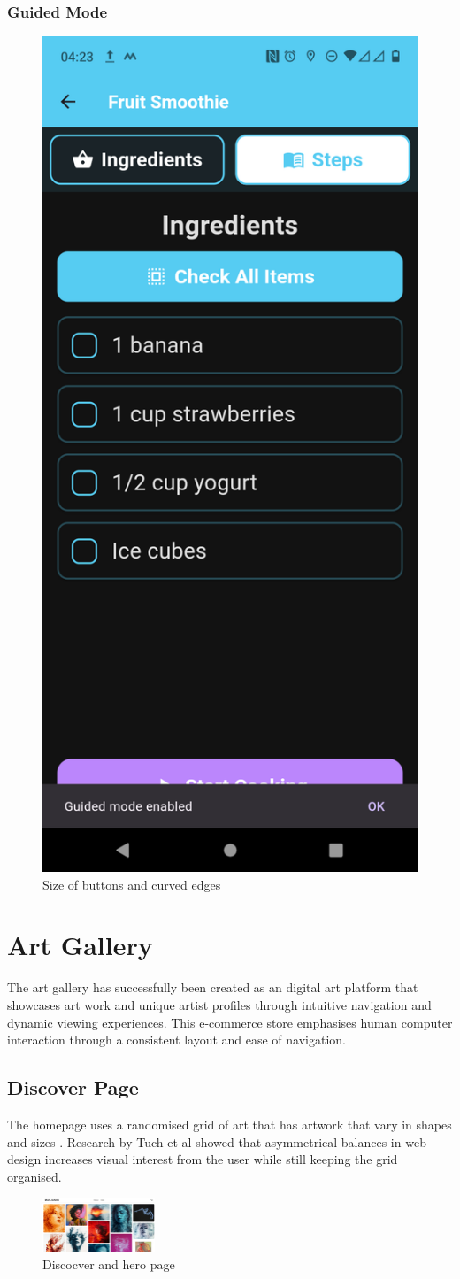 \documentclass[]{project_final}
\begin{document}
\subsubsection{Guided Mode}
\begin{figure}[ht!]
  \centering
  \includegraphics[height=0.5\textwidth]{guided mode.png}
  \caption{Size of buttons and curved edges}
  \label{fig:1}
\end{figure}







\section{Art Gallery}
The art gallery has successfully been created as an digital art platform that showcases art work and unique artist profiles through intuitive navigation and dynamic viewing experiences. This e-commerce store emphasises human computer interaction through a consistent layout and ease of navigation.
\subsection{Discover Page}

The homepage uses a randomised grid of art that has artwork that vary in shapes and sizes . Research by Tuch et al showed that asymmetrical balances in web design increases visual interest from the user while still keeping the grid organised.

\begin{figure}[H]
  \centering
  \includegraphics[width=0.3\textwidth]{AG1.png}
  \vspace*{0.0cm}
  \caption{Discocver and hero page}
  \label{fig:1}
\end{figure}
\end{document}

